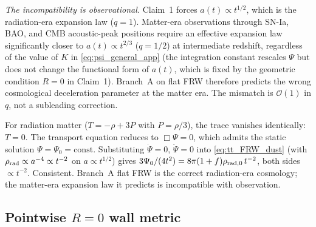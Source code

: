 \documentclass[aps,prd,twocolumn,nofootinbib,floatfix,superscriptaddress]{revtex4-2}
\begin{document}
\emph{The incompatibility is observational.} Claim~1 forces
$a(t) \propto t^{1/2}$, which is the radiation-era expansion law
($q = 1$). Matter-era observations through SN-Ia, BAO, and CMB
acoustic-peak positions require an effective expansion law
significantly closer to $a(t) \propto t^{2/3}$ ($q = 1/2$) at
intermediate redshift, regardless of the value of $K$ in
\eqref{eq:psi_general_app} (the integration constant rescales
$\Psi$ but does not change the functional form of $a(t)$, which is
fixed by the geometric condition $R = 0$ in Claim~1). Branch~A on
flat FRW therefore predicts the wrong cosmological deceleration
parameter at the matter era. The mismatch is $\mathcal O(1)$ in
$q$, not a subleading correction.

For radiation matter ($T = -\rho + 3P$ with $P = \rho/3$), the
trace vanishes identically: $T = 0$. The transport equation reduces
to $\Box\Psi = 0$, which admits the static solution
$\Psi = \Psi_0 = \mathrm{const}$. Substituting $\dot\Psi = 0$,
$\ddot\Psi = 0$ into \eqref{eq:tt_FRW_dust} (with $\rho_{\rm rad}
\propto a^{-4} \propto t^{-2}$ on $a \propto t^{1/2}$) gives
$3\Psi_0/(4t^2) = 8\pi(1+f)\rho_{\rm rad,0}\,t^{-2}$, both sides
$\propto t^{-2}$. Consistent. Branch~A flat FRW is the correct
radiation-era cosmology; the matter-era expansion law it predicts is
incompatible with observation.

\subsection{Pointwise $R = 0$ wall metric}
\label{sec:wall_pointwise}
\end{document}

